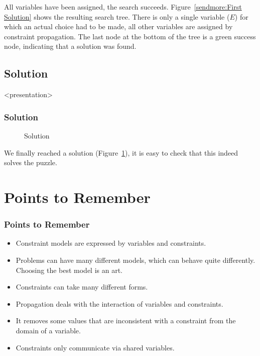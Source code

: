 All variables have been assigned, the search succeeds. Figure~\ref{sendmore:First Solution} shows the resulting search tree. There is only a single variable ($E$) for which an actual choice had to be made, all other variables are assigned by constraint propagation. The last node at the bottom of the tree is a green success node, indicating that a solution was found.


\subsection{Solution}

\begin{frame}<presentation>
\frametitle{Solution}
\begin{center}

\end{center} 
\end{frame}

\begin{figure}[ht]
\caption{\label{sendmore:solution}Solution}
\begin{center}

\end{center}
\end{figure}


We finally reached a solution (Figure~\ref{sendmore:solution}), it is easy to check that this indeed solves the puzzle.

\clearpage
\section{Points to Remember}

\begin{frame}
\frametitle{Points to Remember}
\begin{itemize}
\item Constraint models are expressed by variables and constraints.
\item Problems can have many different models, which can behave quite differently. Choosing the best model is an art.
\item Constraints can take many different forms.
\item Propagation deals with the interaction of variables and constraints.
\item It removes some values that are inconsistent with a constraint from the domain of a variable.
\item Constraints only communicate via shared variables.
\end{itemize}
\end{frame}


